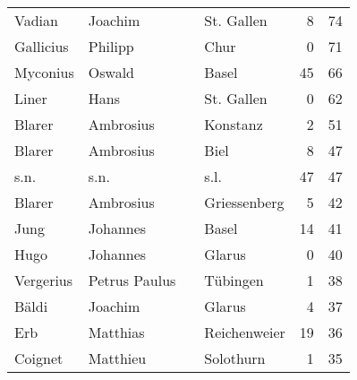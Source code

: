 \begin{tabular}{llllrr}
                   Vadian &                            Joachim &             &                                  St. Gallen &          8 &        74 \\
                Gallicius &                            Philipp &             &                                        Chur &          0 &        71 \\
                 Myconius &                             Oswald &             &                                       Basel &         45 &        66 \\
                    Liner &                               Hans &             &                                  St. Gallen &          0 &        62 \\
                   Blarer &                          Ambrosius &             &                                    Konstanz &          2 &        51 \\
                   Blarer &                          Ambrosius &             &                                        Biel &          8 &        47 \\
                     s.n. &                               s.n. &             &                                        s.l. &         47 &        47 \\
                   Blarer &                          Ambrosius &             &                                Griessenberg &          5 &        42 \\
                     Jung &                           Johannes &             &                                       Basel &         14 &        41 \\
                     Hugo &                           Johannes &             &                                      Glarus &          0 &        40 \\
                Vergerius &                      Petrus Paulus &             &                                    Tübingen &          1 &        38 \\
                    Bäldi &                            Joachim &             &                                      Glarus &          4 &        37 \\
                      Erb &                           Matthias &             &                                Reichenweier &         19 &        36 \\
                  Coignet &                           Matthieu &             &                                   Solothurn &          1 &        35 \\

\end{tabular}
